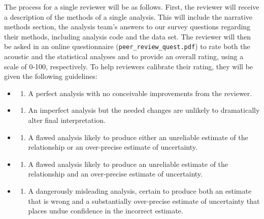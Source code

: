 \documentclass[
  12pt,
]{article}
\providecommand{\tightlist}{%
  \setlength{\itemsep}{0pt}\setlength{\parskip}{0pt}}
\begin{document}
The process for a single reviewer will be as follows.
First, the reviewer will receive a description of the methods of a single analysis.
This will include the narrative methods section, the analysis team's answers to our survey questions regarding their methods, including analysis code and the data set.
The reviewer will then be asked in an online questionnaire (\texttt{peer\_review\_quest.pdf}) to rate both the acoustic and the statistical analyses and to provide an overall rating, using a scale of 0-100, respectively.
To help reviewers calibrate their rating, they will be given the following guidelines:

\begin{itemize}
\item
  \begin{enumerate}
  \def\labelenumi{\arabic{enumi}.}
  \setcounter{enumi}{99}
  \tightlist
  \item
    A perfect analysis with no conceivable improvements from the reviewer.
  \end{enumerate}
\item
  \begin{enumerate}
  \def\labelenumi{\arabic{enumi}.}
  \setcounter{enumi}{74}
  \tightlist
  \item
    An imperfect analysis but the needed changes are unlikely to dramatically alter final interpretation.
  \end{enumerate}
\item
  \begin{enumerate}
  \def\labelenumi{\arabic{enumi}.}
  \setcounter{enumi}{49}
  \tightlist
  \item
    A flawed analysis likely to produce either an unreliable estimate of the relationship or an over-precise estimate of uncertainty.
  \end{enumerate}
\item
  \begin{enumerate}
  \def\labelenumi{\arabic{enumi}.}
  \setcounter{enumi}{24}
  \tightlist
  \item
    A flawed analysis likely to produce an unreliable estimate of the relationship and an over-precise estimate of uncertainty.
  \end{enumerate}
\item
  \begin{enumerate}
  \def\labelenumi{\arabic{enumi}.}
  \setcounter{enumi}{-1}
  \tightlist
  \item
    A dangerously misleading analysis, certain to produce both an estimate that is wrong and a substantially over-precise estimate of uncertainty that places undue confidence in the incorrect estimate.
  \end{enumerate}
\end{itemize}
\end{document}
